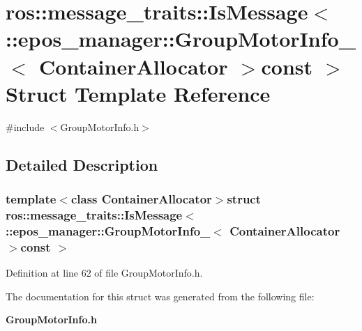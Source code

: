 \section{ros\-:\-:message\-\_\-traits\-:\-:\-Is\-Message$<$ \-:\-:epos\-\_\-manager\-:\-:\-Group\-Motor\-Info\-\_\-$<$ \-Container\-Allocator $>$const $>$ \-Struct \-Template \-Reference}
\label{structros_1_1message__traits_1_1IsMessage_3_01_1_1epos__manager_1_1GroupMotorInfo___3_01ContainerAllocator_01_4const_01_01_4}


{\ttfamily \#include $<$\-Group\-Motor\-Info.\-h$>$}



\subsection{\-Detailed \-Description}
\subsubsection*{template$<$class Container\-Allocator$>$struct ros\-::message\-\_\-traits\-::\-Is\-Message$<$ \-::epos\-\_\-manager\-::\-Group\-Motor\-Info\-\_\-$<$ Container\-Allocator $>$const  $>$}



\-Definition at line 62 of file \-Group\-Motor\-Info.\-h.



\-The documentation for this struct was generated from the following file\-:\begin{DoxyCompactItemize}
\item 
{\bf \-Group\-Motor\-Info.\-h}\end{DoxyCompactItemize}
